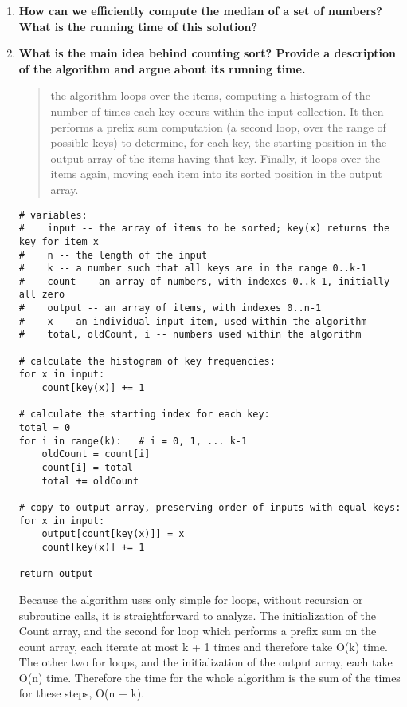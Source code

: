 \documentclass[a4paper,11pt]{article}
\begin{document}
\begin{enumerate}
\def\labelenumi{\arabic{enumi}.}
\item
  \textbf{How can we efficiently compute the median of a set of numbers?
  What is the running time of this solution?}
\item
  \textbf{What is the main idea behind counting sort? Provide a
  description of the algorithm and argue about its running time.}

  \begin{quote}
  the algorithm loops over the items, computing a histogram of the
  number of times each key occurs within the input collection. It then
  performs a prefix sum computation (a second loop, over the range of
  possible keys) to determine, for each key, the starting position in
  the output array of the items having that key. Finally, it loops over
  the items again, moving each item into its sorted position in the
  output array.
  \end{quote}

\begin{verbatim}
# variables:
#    input -- the array of items to be sorted; key(x) returns the key for item x
#    n -- the length of the input
#    k -- a number such that all keys are in the range 0..k-1
#    count -- an array of numbers, with indexes 0..k-1, initially all zero
#    output -- an array of items, with indexes 0..n-1
#    x -- an individual input item, used within the algorithm
#    total, oldCount, i -- numbers used within the algorithm

# calculate the histogram of key frequencies:
for x in input:
    count[key(x)] += 1

# calculate the starting index for each key:
total = 0
for i in range(k):   # i = 0, 1, ... k-1
    oldCount = count[i]
    count[i] = total
    total += oldCount

# copy to output array, preserving order of inputs with equal keys:
for x in input:
    output[count[key(x)]] = x
    count[key(x)] += 1

return output
\end{verbatim}

  Because the algorithm uses only simple for loops, without recursion or
  subroutine calls, it is straightforward to analyze. The initialization
  of the Count array, and the second for loop which performs a prefix
  sum on the count array, each iterate at most k + 1 times and therefore
  take O(k) time. The other two for loops, and the initialization of the
  output array, each take O(n) time. Therefore the time for the whole
  algorithm is the sum of the times for these steps, O(n + k).


\end{enumerate}
\end{document}
